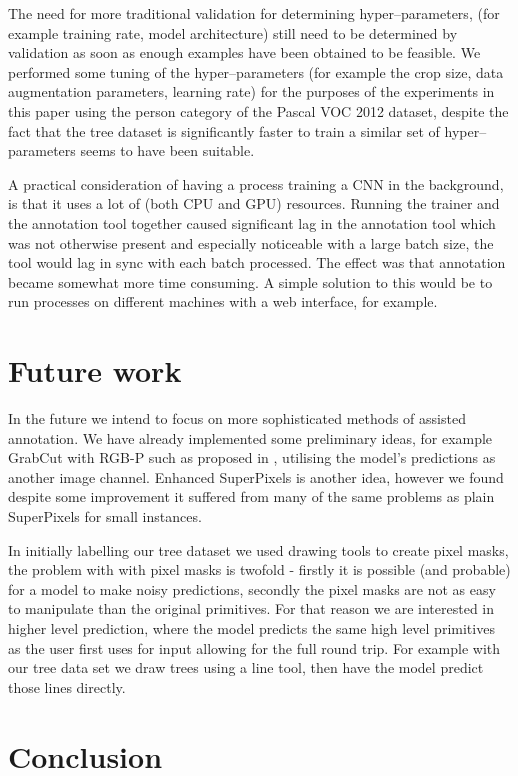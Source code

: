 \documentclass{IEEEtran}
\begin{document}
The need for more traditional validation for determining hyper--parameters, (for example training rate, model architecture) still need to be determined by validation as soon as enough examples have been obtained to be feasible. We performed some tuning of the hyper--parameters (for example the crop size, data augmentation parameters, learning rate) for the purposes of the experiments in this paper using the person category of the Pascal \gls{VOC} 2012 dataset, despite the fact that the tree dataset is significantly faster to train a similar set of hyper--parameters seems to have been suitable.


A practical consideration of having a process training a \gls{CNN} in the background, is that it uses a lot of (both CPU and GPU) resources. Running the trainer and the annotation tool together caused significant lag in the annotation tool which was not otherwise present and especially noticeable with a large batch size, the tool would lag in sync with each batch processed. The effect was that annotation became somewhat more time consuming. A simple solution to this would be to run processes on different machines with a web interface, for example.


\section{Future work}


In the future we intend to focus on more sophisticated methods of assisted annotation. We have already implemented some preliminary ideas, for example GrabCut with RGB-P such as proposed in \cite{Xu2016a}, utilising the model's predictions as another image channel.  Enhanced SuperPixels is another idea, however we found despite some improvement it suffered from many of the same problems as plain SuperPixels for small instances. 

In initially labelling our tree dataset we used drawing tools to create pixel masks, the problem with with pixel masks is twofold - firstly it is possible (and probable) for a model to make noisy predictions, secondly the pixel masks are not as easy to manipulate than the original primitives. For that reason we are interested in higher level prediction, where the model predicts the same high level primitives as the user first uses for input allowing for the full round trip. For example with our tree data set we draw trees using a line tool, then have the model predict those lines directly.


\section {Conclusion}
\end{document}
